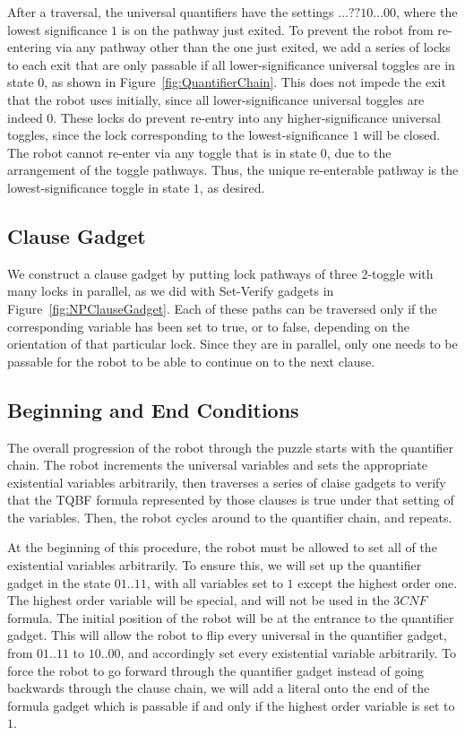 After a traversal, the universal quantifiers have the settings $\ldots??10\ldots00$, where the lowest significance $1$ is 
on the pathway just exited.
To prevent the robot from re-entering via any pathway other than the one just exited, we add a series of locks to each exit that are only passable
if all lower-significance universal toggles are in state $0$, as shown in Figure~\ref{fig:QuantifierChain}.
This does not impede the exit that the robot uses initially, since all
lower-significance universal toggles are indeed $0$. These locks do prevent re-entry into any higher-significance universal toggles, since the
lock corresponding to the lowest-significance $1$ will be closed. The robot cannot re-enter via any toggle that is in state $0$,
due to the arrangement of the toggle pathways. Thus, the unique re-enterable pathway is the lowest-significance toggle in state $1$, as desired.

\subsection{Clause Gadget}
We construct a clause gadget by putting lock pathways of three 2-toggle with many locks in parallel, as we did with Set-Verify gadgets in Figure~\ref{fig:NPClauseGadget}. Each of these paths can be traversed only if the corresponding variable has been set to true, or to false, depending on the orientation of that particular lock. Since they are in parallel, only one needs to be passable for the robot to be able to continue on to the next clause.

\subsection{Beginning and End Conditions}
The overall progression of the robot through the puzzle starts with the quantifier chain.
The robot increments the universal variables and sets the appropriate existential variables arbitrarily, 
then traverses a series of claise gadgets to verify that the TQBF formula represented by those clauses 
is true under that setting of the variables. Then, the robot cycles around to the quantifier chain, and repeats.

At the beginning of this procedure, the robot must be allowed to set all of the existential variables arbitrarily.
To ensure this, we will set up the quantifier gadget in the state $01 .. 11$, with all variables set to $1$
except the highest order one.  The highest order variable will be special, and will not be used in the $3CNF$
formula. The initial position of the robot will be at the entrance to the quantifier gadget. This will allow
the robot to flip every universal in the quantifier gadget, from $01 .. 11$ to $10 .. 00$, and accordingly
set every existential variable arbitrarily. To force the robot to go forward through the quantifier gadget
instead of going backwards through the clause chain, we will add a literal onto the end of the formula gadget
which is passable if and only if the highest order variable is set to $1$.

